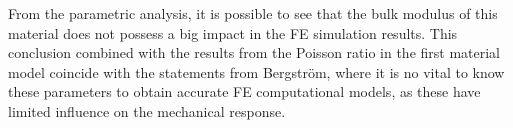 
From the parametric analysis, it is possible to see that the bulk 
modulus of this material does not possess a big impact in the FE 
simulation results. This conclusion combined with the results 
from the Poisson ratio in the first material model coincide with the 
statements from Bergström, where it is no vital to know these parameters 
to obtain accurate FE computational models, as these have limited
influence on the mechanical response. \cite{Bergström2015} %

